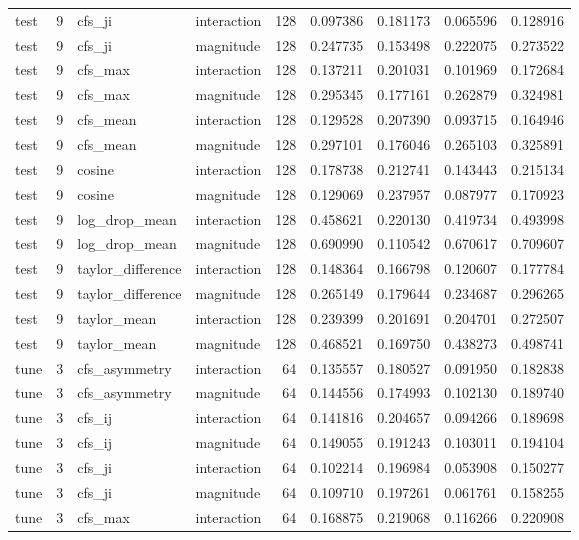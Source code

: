 \begin{tabular}{lrllrrrrr}
test & 9 & cfs_ji & interaction & 128 & 0.097386 & 0.181173 & 0.065596 & 0.128916 \\
test & 9 & cfs_ji & magnitude & 128 & 0.247735 & 0.153498 & 0.222075 & 0.273522 \\
test & 9 & cfs_max & interaction & 128 & 0.137211 & 0.201031 & 0.101969 & 0.172684 \\
test & 9 & cfs_max & magnitude & 128 & 0.295345 & 0.177161 & 0.262879 & 0.324981 \\
test & 9 & cfs_mean & interaction & 128 & 0.129528 & 0.207390 & 0.093715 & 0.164946 \\
test & 9 & cfs_mean & magnitude & 128 & 0.297101 & 0.176046 & 0.265103 & 0.325891 \\
test & 9 & cosine & interaction & 128 & 0.178738 & 0.212741 & 0.143443 & 0.215134 \\
test & 9 & cosine & magnitude & 128 & 0.129069 & 0.237957 & 0.087977 & 0.170923 \\
test & 9 & log_drop_mean & interaction & 128 & 0.458621 & 0.220130 & 0.419734 & 0.493998 \\
test & 9 & log_drop_mean & magnitude & 128 & 0.690990 & 0.110542 & 0.670617 & 0.709607 \\
test & 9 & taylor_difference & interaction & 128 & 0.148364 & 0.166798 & 0.120607 & 0.177784 \\
test & 9 & taylor_difference & magnitude & 128 & 0.265149 & 0.179644 & 0.234687 & 0.296265 \\
test & 9 & taylor_mean & interaction & 128 & 0.239399 & 0.201691 & 0.204701 & 0.272507 \\
test & 9 & taylor_mean & magnitude & 128 & 0.468521 & 0.169750 & 0.438273 & 0.498741 \\
tune & 3 & cfs_asymmetry & interaction & 64 & 0.135557 & 0.180527 & 0.091950 & 0.182838 \\
tune & 3 & cfs_asymmetry & magnitude & 64 & 0.144556 & 0.174993 & 0.102130 & 0.189740 \\
tune & 3 & cfs_ij & interaction & 64 & 0.141816 & 0.204657 & 0.094266 & 0.189698 \\
tune & 3 & cfs_ij & magnitude & 64 & 0.149055 & 0.191243 & 0.103011 & 0.194104 \\
tune & 3 & cfs_ji & interaction & 64 & 0.102214 & 0.196984 & 0.053908 & 0.150277 \\
tune & 3 & cfs_ji & magnitude & 64 & 0.109710 & 0.197261 & 0.061761 & 0.158255 \\
tune & 3 & cfs_max & interaction & 64 & 0.168875 & 0.219068 & 0.116266 & 0.220908 \\

\end{tabular}
